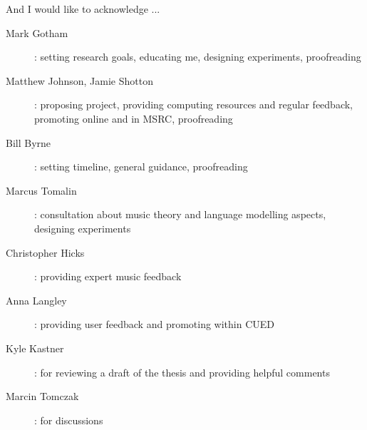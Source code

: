 
\begin{acknowledgements}


And I would like to acknowledge ...


\begin{description}
  \item[Mark Gotham]: setting research goals, educating me, designing experiments, proofreading
  \item[Matthew Johnson, Jamie Shotton]: proposing project, providing computing resources and regular feedback, promoting
    online and in MSRC, proofreading
  \item[Bill Byrne]: setting timeline, general guidance, proofreading
  \item[Marcus Tomalin]: consultation about music theory and language modelling aspects, designing experiments
  \item[Christopher Hicks]: providing expert music feedback
  \item[Anna Langley]: providing user feedback and promoting within CUED
  \item[Kyle Kastner]: for reviewing a draft of the thesis and providing helpful comments
  \item[Marcin Tomczak]: for discussions
\end{description}

\end{acknowledgements}
